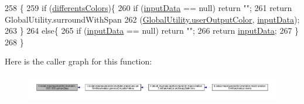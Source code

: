 \begin{DoxyCode}
258                                        \{
259         \textcolor{keywordflow}{if} (\hyperlink{classit_1_1isislab_1_1masonassisteddocumentation_1_1_o_d_d_1_1_o_d_d_a5e99cecaa409eacae00aceb1bbd62a56}{differentsColors})\{
260             \textcolor{keywordflow}{if} (\hyperlink{classit_1_1isislab_1_1masonassisteddocumentation_1_1_o_d_d_1_1_o_d_d_a80d3020ab16a70890782d07321f84644}{inputData} == null) \textcolor{keywordflow}{return} \textcolor{stringliteral}{""};
261             \textcolor{keywordflow}{return} GlobalUtility.surroundWithSpan
262                 (\hyperlink{classit_1_1isislab_1_1masonassisteddocumentation_1_1mason_1_1analizer_1_1_global_utility_a0fcb324ae33eb93bd5b9177e342ecc82}{GlobalUtility.userOutputColor}, 
      \hyperlink{classit_1_1isislab_1_1masonassisteddocumentation_1_1_o_d_d_1_1_o_d_d_a80d3020ab16a70890782d07321f84644}{inputData});
263         \}
264         \textcolor{keywordflow}{else}\{
265             \textcolor{keywordflow}{if} (\hyperlink{classit_1_1isislab_1_1masonassisteddocumentation_1_1_o_d_d_1_1_o_d_d_a80d3020ab16a70890782d07321f84644}{inputData} == null) \textcolor{keywordflow}{return} \textcolor{stringliteral}{""};
266             \textcolor{keywordflow}{return} \hyperlink{classit_1_1isislab_1_1masonassisteddocumentation_1_1_o_d_d_1_1_o_d_d_a80d3020ab16a70890782d07321f84644}{inputData};
267         \}
268     \}
\end{DoxyCode}


Here is the caller graph for this function\-:
\nopagebreak
\begin{figure}[H]
\begin{center}
\leavevmode
\includegraphics[width=350pt]{classit_1_1isislab_1_1masonassisteddocumentation_1_1_o_d_d_1_1_o_d_d_a733268d9fc89d2fce7c31bdc1dbc8b15_icgraph}
\end{center}
\end{figure}


